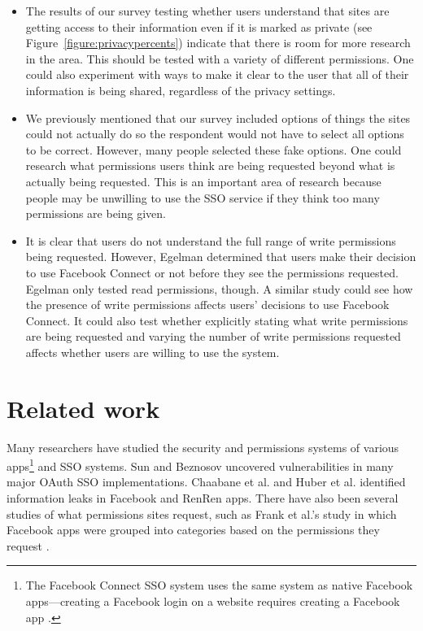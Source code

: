 \documentclass[10pt]{sig-alternate-10pt}
\begin{document}
\begin{itemize}
  \item The results of our survey testing whether users understand that sites are getting access to their information even if it is marked as private (see Figure~\ref{figure:privacypercents}) indicate that there is room for more research in the area. This should be tested with a variety of different permissions. One could also experiment with ways to make it clear to the user that all of their information is being shared, regardless of the privacy settings.
  \item We previously mentioned that our survey included options of things the sites could not actually do so the respondent would not have to select all options to be correct. However, many people selected these fake options. One could research what permissions users think are being requested beyond what is actually being requested. This is an important area of research because people may be unwilling to use the SSO service if they think too many permissions are being given.
  \item It is clear that users do not understand the full range of write permissions being requested. However, Egelman \cite{egelman} determined that users make their decision to use Facebook Connect or not before they see the permissions requested. Egelman only tested read permissions, though. A similar study could see how the presence of write permissions affects users' decisions to use Facebook Connect. It could also test whether explicitly stating what write permissions are being requested and varying the number of write permissions requested affects whether users are willing to use the system.
\end{itemize}

\section{Related work}
\label{sec:research}

Many researchers have studied the security and permissions systems of various apps\footnote{The Facebook Connect SSO system uses the same system as native Facebook apps---creating a Facebook login on a website requires creating a Facebook app \cite{fbexample}.} and SSO systems. Sun and Beznosov \cite{devildetails} uncovered vulnerabilities in many major OAuth SSO implementations. Chaabane et al. \cite{chaabane} and Huber et al. \cite{appinspect} identified information leaks in Facebook and RenRen apps. There have also been several studies of what permissions sites request, such as Frank et al.'s study in which Facebook apps were grouped into categories based on the permissions they request \cite{miningpermissions}.
\end{document}
